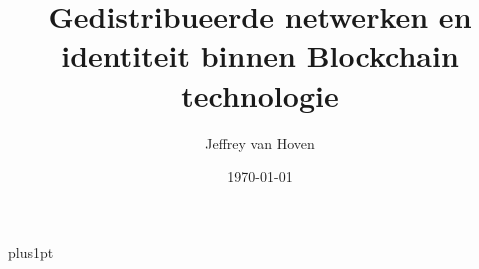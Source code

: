 \documentclass{Quintorthesis}
\begin{document}
  \baselineskip=15pt plus1pt
  \parskip=15pt
  \setcounter{secnumdepth}{2}
  \setcounter{tocdepth}{2}

  \renewcommand\appendixpagename{Bijlages}
  \renewcommand\appendixtocname{Bijlages}
  \newcommand{\hsp}{\hspace{10pt}}

  \titleformat{\chapter}[hang]{\Huge\bfseries}{\thechapter\hsp\textcolor{quintorred}{|}\hsp}{0pt}{\LARGE\bfseries}
  \titlespacing*{\chapter}{0pt}{0pt}{20pt}
  \titlespacing*{\paragraph}{0pt}{0pt}{10pt}

  \begin{titlepage}
    \title{Gedistribueerde netwerken en identiteit binnen Blockchain technologie}
    \author{Jeffrey van Hoven}
    \date{\today}
    \maketitle
  \end{titlepage}

  \begin{romanpages}
    
    \tableofcontents     
    \listoffigures              
    \listoftables
    \printnoidxglossary[title=Woordenlijst]
    \printnoidxglossary[title=Afkortingen, type=\acronymtype]
  \end{romanpages}

  
  
  
  
  
  
  
  
  
  
  


    
  \setlength\bibsep{\baselineskip}  
  

  
\end{document}
